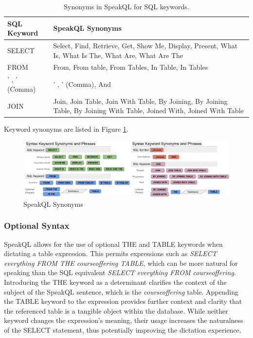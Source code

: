 \begin{table}
  \centering
  \caption{Synonyms in SpeakQL for SQL keywords.}
  \begin{tabular}{|m{6em} m{18em}|}
    \hline
    \textbf{SQL Keyword} & \textbf{SpeakQL Synonyms} \\
    \hline
    SELECT & Select, Find, Retrieve, Get, Show Me, Display, Present, What Is, What Is The, What Are, What Are The \\
    \hline
    FROM & From, From table, From Tables, In Table, In Tables \\
    \hline
    ' , ' (Comma) & ' , ' (Comma), And \\
    \hline
    JOIN & Join, Join Table, Join With Table, By Joining, By Joining Table, By Joining With Table, Joined With, Joined With Table \\
    \hline
  \end{tabular}
  \label{tab:keyword-synonyms}
\end{table}

Keyword synonyms are listed in Figure \ref{fig:synonymsslide}.

\begin{figure}
\centering
\includegraphics[width=\textwidth]{figures/all_synonyms.png}
\caption{SpeakQL Synonyms}
\label{fig:synonymsslide}
\end{figure}

\subsubsection{\textbf{Optional Syntax}} 
SpeakQL allows for the use of optional THE and TABLE keywords when dictating a table expression. 
This permits expressions such as \emph{SELECT everything FROM THE courseoffering TABLE}, which can be more natural for speaking than the SQL equivalent \emph{SELECT everything FROM courseoffering}. 
Introducing the THE keyword as a determinant clarifies the context of the subject of the SpeakQL sentence, which is the \emph{courseoffering} table. 
Appending the TABLE keyword to the expression provides further context and clarity that the referenced table is a tangible object within the database. While neither keyword changes the expression's meaning, their usage increases the naturalness of the SELECT statement, thus potentially improving the dictation experience.


